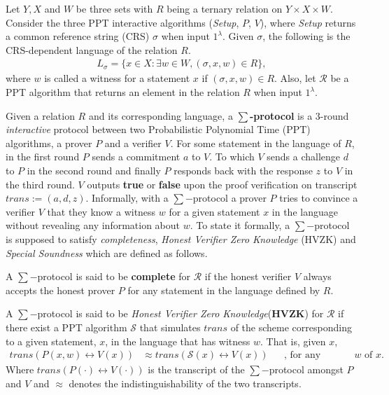 Let $Y,X$ and $W$ be three sets with $R$ being a ternary relation on $Y\times X\times W$. Consider the 
three PPT interactive algorithms (\textit{Setup}, $P$, $V$), where \textit{Setup} returns a 
common reference string (CRS) $\sigma$ when input $1^{\lambda}$. Given $\sigma$, the following 
is the CRS-dependent language of the relation $R$.
\begin{align*}
  L_{\sigma}=\{x\in X :\exists w\in W, (\sigma, x, w)\in R\},
\end{align*}
where $w$ is called a witness for a statement $x$ if $(\sigma, x, w)\in R$. Also, let $\mathcal{R}$ be 
a PPT algorithm that returns an element in the relation $R$ when input $1^{\lambda}$.\par

Given a relation $R$ and its corresponding language, a \textbf{$\sum$-protocol} 
is a $3$-round \textit{interactive} protocol between two Probabilistic Polynomial Time (PPT) algorithms, 
a prover $P$ 
and a verifier $V$. For some statement in the language of $R$, in the first round $P$ sends a 
commitment $a$ to $V$. To which $V$ sends a challenge $d$ to $P$ in the second round 
and finally $P$ responds back with the response $z$ to $V$ in the third round. 
$V$ outputs \textbf{true} or \textbf{false} upon the proof verification on transcript
$trans := (a, d, z)$. 
Informally, with a $\sum-$protocol a prover $P$ tries to convince
a verifier $V$ that they know a witness $w$ for a given statement $x$ in the language without 
revealing any information about $w$. To state it formally, a $\sum-$protocol is 
supposed to satisfy \textit{completeness}, \textit{Honest Verifier Zero Knowledge} (HVZK)
and \textit{Special Soundness} which are defined as follows.

\begin{definition}[Completeness]
  A $\sum-$protocol is said to be \textbf{complete} for $\mathcal{R}$ if
  the honest verifier $V$ always accepts the honest prover $P$ for any statement in the language 
  defined by $R$.
\end{definition}

\begin{definition}[HVZK]
  A $\sum-$protocol is said to be \textit{Honest Verifier Zero Knowledge}(\textbf{HVZK}) for $\mathcal{R}$ if there exist a PPT algorithm $\mathcal{S}$ 
  that simulates $trans$ of the scheme corresponding to a given statement, $x$, in the 
  language that has witness $w$. 
  That is, given $x$,
  \begin{align*}
    trans(P(x,w)\leftrightarrow V(x)) &\approx trans(\mathcal{S}(x) \leftrightarrow V(x))&& \text{, for any witness $w$ of $x$.}
  \end{align*}
  Where $trans(P(\cdot)\leftrightarrow V(\cdot))$ is the transcript of the $\sum-$protocol amongst 
  $P$ and $V$ and $\approx$ denotes the indistinguishability of the two transcripts.
\end{definition}

